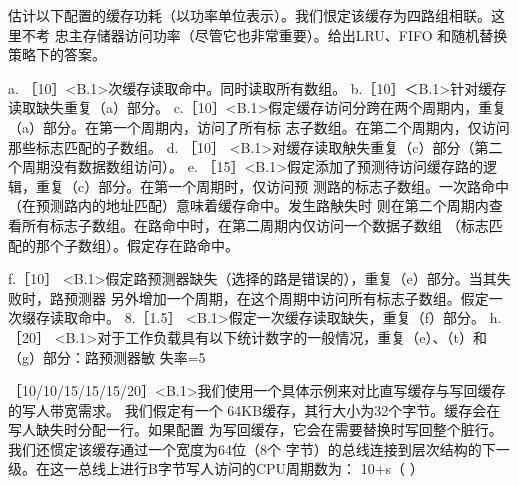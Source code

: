 估计以下配置的缓存功耗（以功率单位表示）。我们恨定该缓存为四路组相联。这里不考
忠主存储器访问功率（尽管它也非常重要）。给出LRU、FIFO 和随机替换策略下的答案。

a. ［10］<B.1>次缓存读取命中。同时读取所有数组。
b.［10］＜B.1>针对缓存读取缺失重复（a）部分。
c.［10］<B.1>假定缓存访问分跨在两个周期内，重复（a）部分。在第一个周期内，访问了所有标
志子数组。在第二个周期内，仅访问那些标志匹配的子数组。
d. ［10］ <B.1>对缓存读取觖失重复（c）部分（第二个周期没有数据数组访问）。
e. ［15］<B.1>假定添加了预测待访问缓存路的逻辑，重复（c）部分。在第一个周期时，仅访问预
测路的标志子数组。一次路命中（在预测路内的地址匹配）意味着缓存命中。发生路觖失时
则在第二个周期内查看所有标志子数组。在路命中时，在第二周期内仅访问一个数据子数组
（标志匹配的那个子数组）。假定存在路命中。

f.［10］ <B.1>假定路预测器缺失（选择的路是错误的），重复（e）部分。当其失败时，路预测器
另外增加一个周期，在这个周期中访问所有标志子数组。假定一次缀存读取命中。
8.［1.5］ <B.1>假定一次缓存读取缺失，重复（f）部分。
h. ［20］ <B.1>对于工作负载具有以下统计数字的一般情况，重复（e）、（t）和（g）部分：路预测器敏
失率=5%

［10/10/15/15/15/20］<B.1>我们使用一个具体示例来对比直写缓存与写回缓存的写人带宽需求。
我们假定有一个 64KB缓存，其行大小为32个字节。缓存会在写人缺失时分配一行。如果配置
为写回缓存，它会在需要替换时写回整个脏行。我们还惯定该缓存通过一个宽度为64位（8个
字节）的总线连接到层次结构的下一级。在这一总线上进行B字节写人访问的CPU周期数为：
10+s（ ）

